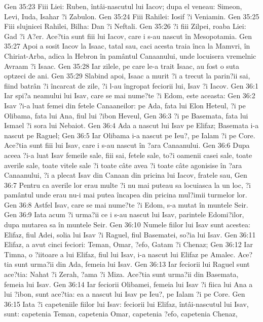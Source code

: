 Gen 35:23  Fiii Liei: Ruben, întâi-nascutul lui Iacov; dupa el veneau: Simeon, Levi, Iuda, Isahar ?i Zabulon.
Gen 35:24  Fiii Rahilei: Iosif ?i Veniamin.
Gen 35:25  Fiii slujnicei Rahilei, Bilha: Dan ?i Neftali.
Gen 35:26  ?i fiii Zilpei, roaba Liei: Gad ?i A?er. Ace?tia sunt fiii lui Iacov, care i s-au nascut în Mesopotamia.
Gen 35:27  Apoi a sosit Iacov la Isaac, tatal sau, caci acesta traia înca la Mamvri, în Chiriat-Arba, adica la Hebron în pamântul Canaanului, unde locuisera vremelnic Avraam ?i Isaac.
Gen 35:28  Iar zilele, pe care le-a trait Isaac, au fost o suta optzeci de ani.
Gen 35:29  Slabind apoi, Isaac a murit ?i a trecut la parin?ii sai, fiind batrân ?i încarcat de zile, ?i l-au îngropat feciorii lui, Isav ?i Iacov.
Gen 36:1  Iar spi?a neamului lui Isav, care se mai nume?te ?i Edom, este aceasta:
Gen 36:2  Isav ?i-a luat femei din fetele Canaaneilor: pe Ada, fata lui Elon Heteul, ?i pe Olibama, fata lui Ana, fiul lui ?ibon Heveul,
Gen 36:3  ?i pe Basemata, fata lui Ismael ?i sora lui Nebaiot.
Gen 36:4  Ada a nascut lui Isav pe Elifaz; Basemata i-a nascut pe Raguel;
Gen 36:5  Iar Olibama i-a nascut pe Ieu?, pe Ialam ?i pe Core. Ace?tia sunt fiii lui Isav, care i s-au nascut în ?ara Canaanului.
Gen 36:6  Dupa aceea ?i-a luat Isav femeile sale, fiii sai, fetele sale, to?i oamenii casei sale, toate averile sale, toate vitele sale ?i toate câte avea ?i toate câte agonisise în ?ara Canaanului, ?i a plecat Isav din Canaan din pricina lui Iacov, fratele sau,
Gen 36:7  Pentru ca averile lor erau multe ?i nu mai puteau sa locuiasca la un loc, ?i pamântul unde erau nu-i mai putea încapea din pricina mul?imii turmelor lor.
Gen 36:8  Astfel Isav, care se mai nume?te ?i Edom, s-a mutat în muntele Seir.
Gen 36:9  Iata acum ?i urma?ii ce i s-au nascut lui Isav, parintele Edomi?ilor, dupa mutarea sa în muntele Seir.
Gen 36:10  Numele fiilor lui Isav sunt acestea: Elifaz, fiul Adei, solia lui Isav ?i Raguel, fiul Basematei, so?ia lui Isav.
Gen 36:11  Elifaz, a avut cinci feciori: Teman, Omar, ?efo, Gatam ?i Chenaz;
Gen 36:12  Iar Timna, o ?iitoare a lui Elifaz, fiul lui Isav, i-a nascut lui Elifaz pe Amalec. Ace?tia sunt urma?ii din Ada, femeia lui Isav.
Gen 36:13  Iar feciorii lui Raguel sunt ace?tia: Nahat ?i Zerah, ?ama ?i Miza. Ace?tia sunt urma?ii din Basemata, femeia lui Isav.
Gen 36:14  Iar feciorii Olibamei, femeia lui Isav ?i fiica lui Ana a lui ?ibon, sunt ace?tia: ea a nascut lui Isav pe Ieu?, pe Ialam ?i pe Core.
Gen 36:15  Iata ?i capeteniile fiilor lui Isav: feciorii lui Elifaz, întâi-nascutul lui Isav, sunt: capetenia Teman, capetenia Omar, capetenia ?efo, capetenia Chenaz,
